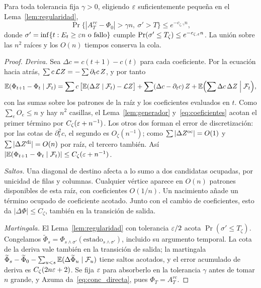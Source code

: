 \begin{lema}\label{lem:conc_directa}
Para toda tolerancia fija $\gamma>0$, eligiendo $\varepsilon$ suficientemente pequeña en el
Lema~\ref{lem:regularidad},
\begin{equation}\label{eq:conc_directa}
 \Pr\bigl\{|A_T^{rc}-\Phi_0|>\gamma n,\ \sigma'>T\bigr\}\le e^{-c_{\zeta,\gamma}n},
\end{equation}
donde $\sigma'=\inf\{t:E_t\ge\varepsilon n\text{ o fallo}\}$ cumple $\Pr(\sigma'\le T_\zeta)\le
e^{-c_{\zeta,\varepsilon}n}$. La unión sobre las $n^2$ raíces y los $O(n)$ tiempos conserva la cola.
\end{lema}

\begin{proof}
\emph{Deriva.} Sea $\Delta c=c(t+1)-c(t)$ para cada coeficiente. Por la ecuación hacia atrás,
$\sum c\,\mathcal{L} Z=-\sum\partial_tc\,Z$, y por tanto
\[
 \mathbb{E}(\Phi_{t+1}-\Phi_t\mid\mathcal F_t)=\sum c\,\bigl[\mathbb{E}(\Delta Z\mid\mathcal F_t)-\mathcal{L} Z\bigr]
 +\sum(\Delta c-\partial_tc)\,Z+\mathbb{E}\Bigl(\sum\Delta c\,\Delta Z\Bigm|\mathcal F_t\Bigr),
\]
con las sumas sobre los patrones de la raíz y los coeficientes evaluados en $t$. Como
$\sum_eO_e\le n$ y hay $n^2$ casillas, el Lema~\ref{lem:generador} y~\eqref{eq:coeficientes}
acotan el primer término por $C_\zeta(\varepsilon+n^{-1})$. Los otros dos forman el error de
discretización: por las cotas de $\partial_t^2c$, el segundo es $O_\zeta(n^{-1})$; como
$\sum|\Delta Z^{\mathrm{oc}}|=O(1)$ y $\sum|\Delta Z^{\mathrm{di}}|=O(n)$ por raíz, el tercero también. Así
$|\mathbb{E}(\Phi_{t+1}-\Phi_t\mid\mathcal F_t)|\le C_\zeta(\varepsilon+n^{-1})$.

\emph{Saltos.} Una diagonal de destino afecta a lo sumo a dos candidatas ocupadas, por unicidad
de filas y columnas. Cualquier vértice aparece en $O(n)$ patrones disponibles de esta raíz, con
coeficientes $O(1/n)$. Un nacimiento añade un término ocupado de coeficiente acotado. Junto con
el cambio de coeficientes, esto da $|\Delta\Phi|\le C_\zeta$, también en la transición de salida.

\emph{Martingala.} El Lema~\ref{lem:regularidad} con tolerancia $\varepsilon/2$ acota
$\Pr(\sigma'\le T_\zeta)$. Congelamos
$\widetilde\Phi_s=\Phi_{s\wedge\sigma'}(\text{estado}_{s\wedge\sigma'})$,
incluido su argumento temporal. La cota de la deriva vale también en la transición de salida; la
martingala $\widetilde\Phi_s-\widetilde\Phi_0-\sum_{u<s}\mathbb{E}(\Delta\widetilde\Phi_u\mid\mathcal F_u)$
tiene saltos acotados, y el error acumulado de deriva es $C_\zeta(2n\varepsilon+2)$. Se fija $\varepsilon$ para
absorberlo en la tolerancia $\gamma$ antes de tomar $n$ grande, y Azuma da~\eqref{eq:conc_directa},
pues $\Phi_T=A_T^{rc}$.
\end{proof}

